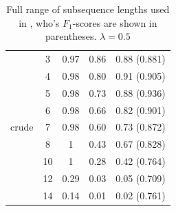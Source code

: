 \begin{table}
\begin{tabular}{| c | c | c | c | c | }
		
		& 3 & 0.97 & 0.86 &  0.88  (0.881)  \\ 
		& 4 & 0.98 & 0.80 & 0.91  (0.905)   \\ 
		& 5 & 0.98 & 0.73 &  0.88 (0.936)   \\ 
		& 6 & 0.98 & 0.66 &  0.82  (0.901)  \\
		crude& 7 & 0.98 & 0.60 &  0.73 (0.872)  \\
		& 8 & 1 & 0.43 &  0.67   (0.828) \\ 
		& 10 & 1 & 0.28 &  0.42   (0.764) \\ 
		& 12 & 0.29 & 0.03 &  0.05   (0.709) \\ 
		& 14 & 0.14 & 0.01 &  0.02   (0.761) \\ \hline 
			
	\end{tabular}
\caption{Full range of subsequence lengths used in \cite{lodhi}, who's  $ F_1 $-scores are shown in parentheses.  $  \lambda = 0.5$\label{tab:appendix_ssk_n}}

\end{table}






